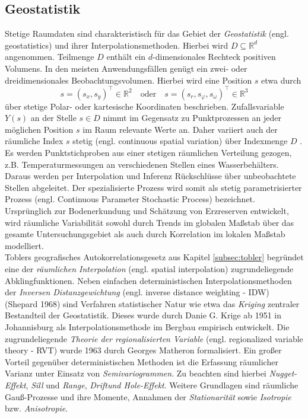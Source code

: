 \subsection*{Geostatistik}
\label{subsec:geostatistics}
Stetige Raumdaten sind charakteristisch für das Gebiet der \emph{Geostatistik} 
(engl. geostatistics) und ihrer Interpolationsmethoden. Hierbei wird 
$D \subseteq \mathds{R}^d$ angenommen. Teilmenge $D$ enthält ein $d$-dimensionales 
Rechteck positiven Volumens. In den meisten Anwendungsfällen genügt ein zwei- oder 
dreidimensionales Beobachtungsvolumen. Hierbei wird eine Position $s$ etwa durch
\begin{equation*}
    s=\left(s_x,s_y \right)^{\top} \in \mathds{R}^2 \quad \text{oder} 
    \quad s=\left(s_r,s_{\varphi },s_{\omega} \right)^{\top} \in \mathds{R}^3
\end{equation*}
über stetige Polar- oder kartesische Koordinaten beschrieben. 
Zufallsvariable $Y(s)$ an der Stelle $s \in D$ nimmt im Gegensatz zu Punktprozessen an 
jeder möglichen Position $s$ im Raum relevante Werte an. 
Daher variiert auch der räumliche Index $s$ stetig (engl. continuous spatial variation) 
über Indexmenge $D$ \citep[S.17]{gelfand_handbook_2010}. 
Es werden Punktstichproben aus einer stetigen räumlichen Verteilung gezogen, 
z.B. Temperaturmessungen an verschiedenen Stellen eines Wasserbehälters. 
Daraus werden per Interpolation und Inferenz Rückschlüsse über unbeobachtete Stellen abgeleitet. 
Der spezialisierte Prozess wird somit als stetig parametrisierter Prozess
(engl. Continuous Parameter Stochastic Process) bezeichnet. 
Ursprünglich zur Bodenerkundung und Schätzung von Erzreserven entwickelt, 
wird räumliche Variabilität sowohl durch Trends 
im globalen Maßstab über das gesamte Untersuchungsgebiet als auch 
durch Korrelation im lokalen Maßstab modelliert.\\

Toblers geografisches Autokorrelationsgesetz aus Kapitel \ref{subsec:tobler} 
begründet eine der \emph{räumlichen Interpolation} (engl. spatial interpolation) zugrundeliegende Abklingfunktionen. 
Neben einfachen deterministischen Interpolationsmethoden 
der \emph{Inversen Distanzgewichtung} (engl. inverse distance weighting - IDW)  (Shepard 1968)
sind Verfahren statistischer Natur wie etwa 
das \emph{Kriging} zentraler Bestandteil der Geostatistik. 
Dieses wurde durch Danie G. Krige ab 1951 
in Johannisburg als Interpolationsmethode im Bergbau empirisch entwickelt.
Die zugrundeliegende \emph{Theorie der regionalisierten Variable} 
(engl. regionalized variable theory - RVT) wurde 1963 durch Georges Matheron formalisiert. 
Ein großer Vorteil gegenüber deterministischen Methoden ist die Erfassung räumlicher Varianz unter 
Einsatz von \emph{Semivariogrammen}. 
Zu beachten sind hierbei \emph{Nugget-Effekt}, \emph{Sill} und \emph{Range}, 
\emph{Driftund Hole-Effekt}.
Weitere Grundlagen sind räumliche Gauß-Prozesse und ihre Momente, 
Annahmen der \emph{Stationarität} sowie \emph{Isotropie} bzw. \emph{Anisotropie}.

